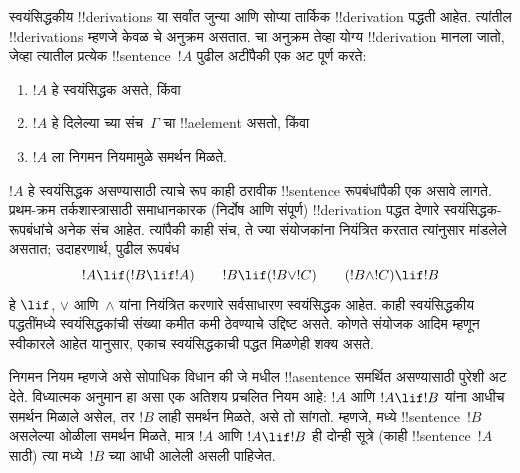 \documentclass[../../../include/open-logic-section]{subfiles}
\begin{document}
      {}
      {}


स्वयंसिद्धकीय !!{derivation}s या सर्वांत जुन्या आणि सोप्या तार्किक
!!{derivation} पद्धती आहेत. त्यांतील !!{derivation}s म्हणजे केवळ
चे अनुक्रम असतात. चा अनुक्रम तेव्हा योग्य
!!{derivation} मानला जातो, जेव्हा त्यातील प्रत्येक !!{sentence}~$!A$ पुढील
अटींपैकी एक अट पूर्ण करते:
\begin{enumerate}
\item $!A$ हे स्वयंसिद्धक असते, किंवा
\item $!A$ हे दिलेल्या च्या संच~$\Gamma$ चा !!a{element} असतो, किंवा
\item $!A$ ला निगमन नियमामुळे समर्थन मिळते.
\end{enumerate}
$!A$ हे स्वयंसिद्धक असण्यासाठी त्याचे रूप काही ठरावीक !!{sentence}
रूपबंधांपैकी एक असावे लागते. प्रथम-क्रम तर्कशास्त्रासाठी समाधानकारक
(निर्दोष आणि संपूर्ण) !!{derivation} पद्धत देणारे स्वयंसिद्धक-रूपबंधांचे
अनेक संच आहेत. त्यांपैकी काही संच, ते ज्या संयोजकांना नियंत्रित करतात
त्यांनुसार मांडलेले असतात; उदाहरणार्थ, पुढील रूपबंध
\[
!A \lif (!B \lif !A) \qquad !B \lif (!B \lor !C) \qquad (!B \land !C) \lif !B
\]
हे $\lif$, $\lor$ आणि~$\land$ यांना नियंत्रित करणारे सर्वसाधारण स्वयंसिद्धक
आहेत. काही स्वयंसिद्धकीय पद्धतींमध्ये स्वयंसिद्धकांची संख्या कमीत कमी
ठेवण्याचे उद्दिष्ट असते. कोणते संयोजक आदिम म्हणून स्वीकारले आहेत यानुसार,
एकाच स्वयंसिद्धकाची पद्धत मिळणेही शक्य असते.

निगमन नियम म्हणजे असे सोपाधिक विधान की जे मधील
!!a{sentence} समर्थित असण्यासाठी पुरेशी अट देते. विध्यात्मक अनुमान हा असा
एक अतिशय प्रचलित नियम आहे: $!A$ आणि $!A \lif !B$ यांना आधीच समर्थन मिळाले
असेल, तर $!B$ लाही समर्थन मिळते, असे तो सांगतो. म्हणजे, मध्ये !!{sentence}~$!B$ असलेल्या ओळीला समर्थन मिळते, मात्र $!A$ आणि
$!A \lif !B$ ही दोन्ही सूत्रे (काही !!{sentence}~$!A$ साठी) त्या
मध्ये~$!B$ च्या आधी आलेली असली पाहिजेत.
\end{document}
